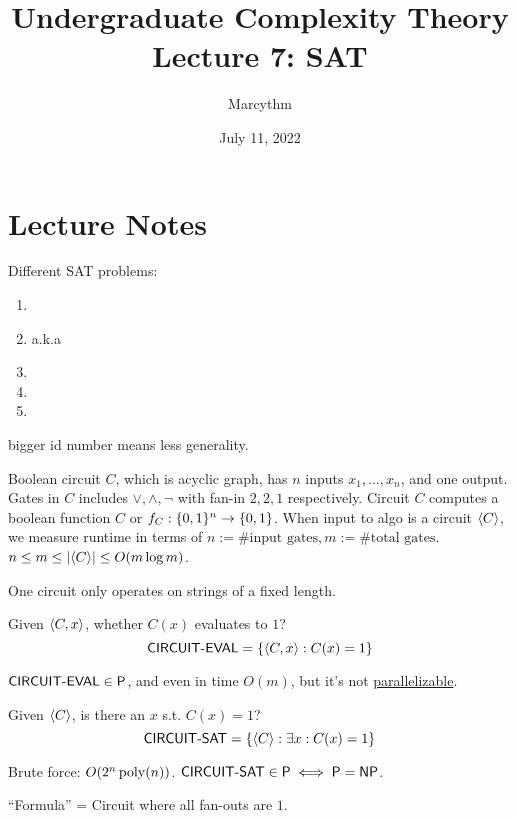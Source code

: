 \documentclass{article}
\title{Undergraduate Complexity Theory \\ Lecture 7: SAT}
\author{Marcythm}
\date{July 11, 2022}
\begin{document}
\maketitle{}

\section{Lecture Notes}

Different SAT problems:
\begin{enumerate}
  \item {}
  \item {} a.k.a 
  \item {}
  \item {}
  \item {}
\end{enumerate}
bigger id number means less generality.

Boolean circuit \(C\), which is acyclic graph, has \(n\) inputs \(x_1, \ldots, x_n\), and one output. Gates in \(C\) includes \(\vee, \wedge, \neg\) with fan-in \(2, 2, 1\) respectively. Circuit \(C\) computes a boolean function \(C\) or \(f_C: \lbrace0, 1\rbrace^n \to \lbrace0, 1\rbrace\).
When input to algo is a circuit \(\langle C\rangle\), we measure runtime in terms of \(n := \text{\# input gates}, m := \text{\# total gates}\). \(n \leq m \leq \lvert\langle C\rangle\rvert \leq O(m \log m)\).

\begin{remark}
  One circuit only operates on strings of a fixed length.
\end{remark}

\begin{definition}
  Given \(\langle C, x\rangle\), whether \(C(x)\) evaluates to \(1\)?
  \[ \text{\sf CIRCUIT-EVAL} = \lbrace\langle C, x\rangle : C(x) = 1\rbrace \]
\end{definition}

\(\text{\sf CIRCUIT-EVAL} \in \text{\sf P}\), and even in time \(O(m)\), but it's not \ul{parallelizable}.

\begin{definition}
  Given \(\langle C\rangle\), is there an \(x\) s.t. \(C(x) = 1\)?
  \[ \text{\sf CIRCUIT-SAT} = \lbrace\langle C\rangle : \exists x: C(x) = 1\rbrace \]
\end{definition}

Brute force: \(O(2^n \operatorname{poly}(n))\). \( \text{\sf CIRCUIT-SAT} \in \text{\sf P} \iff \text{\sf P} = \text{\sf NP} \).

\begin{definition}
  ``Formula'' = Circuit where all fan-outs are \(1\).
\end{definition}
\end{document}
